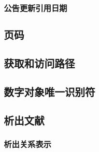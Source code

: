 \documentclass{article}
\begin{document}
\subsubsection{公告更新引用日期}
\begin{refsection}
\nocite{egbookpubdateg--}
\end{refsection}

\subsection{页码}
\begin{refsection}
\nocite{曹凌2011-19-}
\nocite{钱学森2001--}
\nocite{冯友兰2008--}
\nocite{李约瑟1991--}
\nocite{DUBAR2013--}
\printbibliography[heading=subbibliography,title=页码示例]
\end{refsection}


\subsection{获取和访问路径}
\begin{refsection}

\nocite{储大同2010-721-724,weiner2010-38}

\printbibliography[heading=subbibliography,title={示例}]
\end{refsection}

\subsection{数字对象唯一识别符}
\begin{refsection}

\nocite{刘乃安2000-17-18,Deverell2013-21-22}
\printbibliography[heading=subbibliography,title={示例}]
\end{refsection}

\subsection{析出文献}

\subsubsection{析出关系表示}
\begin{refsection}

\nocite{姚中秋2009--,关立哲2014--,TENOPIR1987--}

\printbibliography[heading=subbibliography,title={示例}]
\end{refsection}
\end{document}
